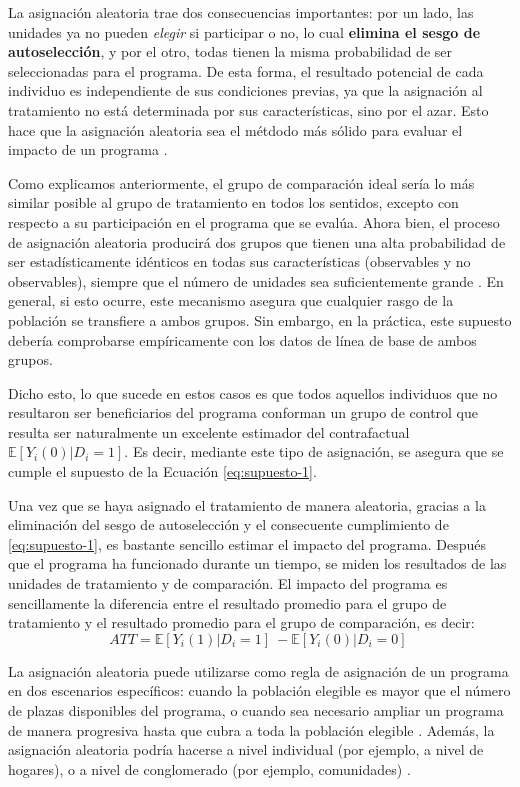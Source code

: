 \documentclass[../../main.tex]{subfiles}
\begin{document}
La asignación aleatoria trae dos consecuencias importantes: por un lado, las unidades ya
no pueden \textit{elegir} si participar o no, lo cual \textbf{elimina el sesgo de
autoselección}, y por el otro, todas tienen la misma probabilidad de ser seleccionadas
para el programa. De esta forma, el resultado potencial de cada individuo es independiente
de sus condiciones previas, ya que la asignación al tratamiento no está determinada por
sus características, sino por el azar. Esto hace que la asignación aleatoria sea el
métdodo más sólido para evaluar el impacto de un programa \cite{gertler-2016}.

Como explicamos anteriormente, el grupo de comparación ideal sería lo más similar posible
al grupo de tratamiento en todos los sentidos, excepto con respecto a su participación en
el programa que se evalúa. Ahora bien, el proceso de asignación aleatoria producirá dos
grupos que tienen una alta probabilidad de ser estadísticamente idénticos en todas sus
características (observables y no observables), siempre que el número de unidades sea
suficientemente grande \cite{gertler-2016}. En general, si esto ocurre, este mecanismo
asegura que cualquier rasgo de la población se transfiere a ambos grupos. Sin embargo, en
la práctica, este supuesto debería comprobarse empíricamente con los datos de línea de
base de ambos grupos.

Dicho esto, lo que sucede en estos casos es que todos aquellos individuos que no
resultaron ser beneficiarios del programa conforman un grupo de control que resulta ser
naturalmente un excelente estimador del contrafactual \(\mathbb{E}
\left[Y_i(0)|D_i=1\right]\). Es decir, mediante este tipo de asignación, se asegura que se
cumple el supuesto de la Ecuación \ref{eq:supuesto-1}.

Una vez que se haya asignado el tratamiento de manera aleatoria, gracias a la eliminación
del sesgo de autoselección y el consecuente cumplimiento de \ref{eq:supuesto-1}, es
bastante sencillo estimar el impacto del programa. Después que el programa ha funcionado
durante un tiempo, se miden los resultados de las unidades de tratamiento y de
comparación. El impacto del programa es sencillamente la diferencia entre el resultado
promedio para el grupo de tratamiento y el resultado promedio para el grupo de
comparación, es decir:
\[
    ATT = \mathbb{E} \left[Y_i(1)|D_i=1\right]\ - \mathbb{E} \left[Y_i(0)|D_i=0\right]\
\]

La asignación aleatoria puede utilizarse como regla de asignación de un programa en dos
escenarios específicos: cuando la población elegible es mayor que el número de plazas
disponibles del programa, o  cuando sea necesario ampliar un programa de manera progresiva
hasta que cubra a toda la población elegible \cite{gertler-2016}. Además, la asignación
aleatoria podría hacerse a nivel individual (por ejemplo, a nivel de hogares), o a nivel
de conglomerado (por ejemplo, comunidades) \cite{bernal}.
\end{document}
